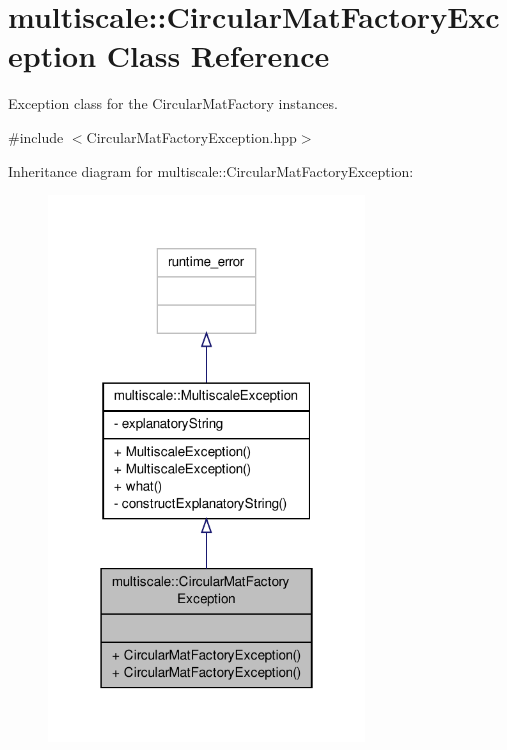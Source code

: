 \hypertarget{classmultiscale_1_1CircularMatFactoryException}{\section{multiscale\-:\-:Circular\-Mat\-Factory\-Exception Class Reference}
\label{classmultiscale_1_1CircularMatFactoryException}
}


Exception class for the Circular\-Mat\-Factory instances.  




{\ttfamily \#include $<$Circular\-Mat\-Factory\-Exception.\-hpp$>$}



Inheritance diagram for multiscale\-:\-:Circular\-Mat\-Factory\-Exception\-:
\nopagebreak
\begin{figure}[H]
\begin{center}
\leavevmode
\includegraphics[width=238pt]{classmultiscale_1_1CircularMatFactoryException__inherit__graph}
\end{center}
\end{figure}


